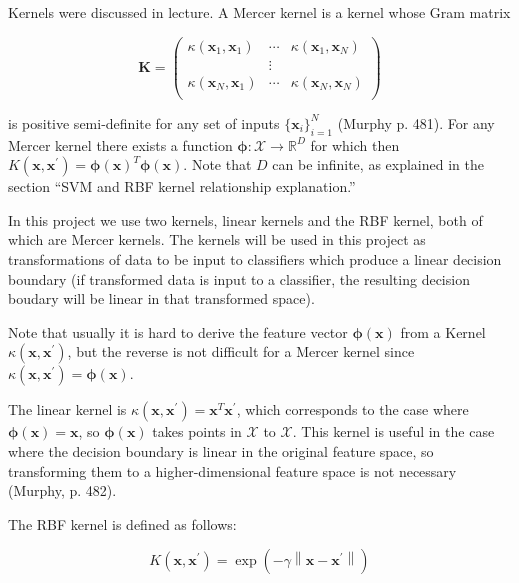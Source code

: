 \documentclass[letterpaper, 12pt]{article}
\newcommand{\norm}[1]{\left\lVert #1 \right\rVert}
\newcommand{\vect}[1]{\boldsymbol{#1}}
\begin{document}
Kernels were discussed in lecture. A Mercer kernel is a kernel whose Gram matrix

\begin{equation*}
  \vect{K} = \begin{pmatrix}
    \kappa(\vect{x}_1, \vect{x}_1) & \cdots & \kappa(\vect{x}_1, \vect{x}_N) \\
    & \vdots & \\
    \kappa(\vect{x}_N, \vect{x}_1) & \cdots & \kappa(\vect{x}_N, \vect{x}_N) \\    
  \end{pmatrix}
\end{equation*}

is positive semi-definite for any set of inputs $\{\vect{x}_i\}_{i=1}^N$ (Murphy p. 481). For any Mercer kernel there exists a function $\vect{\phi}: \mathcal{X} \rightarrow \mathbb{R}^D$ for which then $K(\vect{x}, \vect{x}^\prime) = \vect{\phi}(\vect{x})^T\vect{\phi}(\vect{x})$. Note that $D$ can be infinite, as explained in the section ``SVM and RBF kernel relationship explanation.''

In this project we use two kernels, linear kernels and the RBF kernel, both of which are Mercer kernels. The kernels will be used in this project as transformations of data to be input to classifiers which produce a linear decision boundary (if transformed data is input to a classifier, the resulting decision boudary will be linear in that transformed space).

Note that usually it is hard to derive the feature vector $\vect{\phi}(\vect{x})$ from a Kernel $\kappa(\vect{x}, \vect{x}^\prime)$, but the reverse is not difficult for a Mercer kernel since $\kappa(\vect{x}, \vect{x}^\prime) = \vect{\phi}(\vect{x})$.

The linear kernel is $\kappa(\vect{x}, \vect{x}^\prime) = \vect{x}^T\vect{x}^\prime$, which corresponds to the case where $\vect{\phi}(\vect{x}) = \vect{x}$, so $\vect{\phi}(\vect{x})$ takes points in $\mathcal{X}$ to $\mathcal{X}$. This kernel is useful in the case where the decision boundary is linear in the original feature space, so transforming them to a higher-dimensional feature space is not necessary (Murphy, p. 482).

The RBF kernel is defined as follows:

\begin{equation*}
  K(\vect{x}, \vect{x}^\prime) = \exp\left(-\gamma \norm{\vect{x} - \vect{x}^\prime}\right)
\end{equation*}
\end{document}
